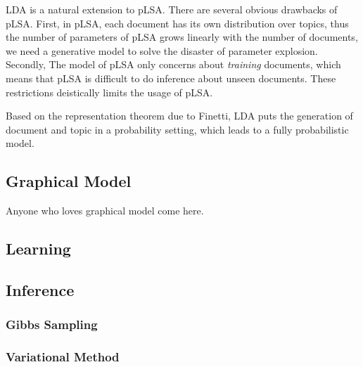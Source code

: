 LDA\cite{blei2003latent} is a natural extension to pLSA. There are several obvious drawbacks of pLSA. First, in pLSA, each document has its own distribution over topics, thus the number of parameters of pLSA grows linearly with the number of documents, we need a generative model to solve the disaster of parameter explosion. Secondly, The model of pLSA only concerns about \emph{training} documents, which means that pLSA is difficult to do inference about unseen documents. These restrictions deistically limits the usage of pLSA. 

Based on the representation theorem due to Finetti\cite{de1970theory}, LDA puts the generation of document and topic in a probability setting, which leads to a fully probabilistic model. 

\subsection{Graphical Model}
Anyone who loves graphical model come here.

\subsection{Learning}


\subsection{Inference}
\subsubsection{Gibbs Sampling}
\subsubsection{Variational Method}